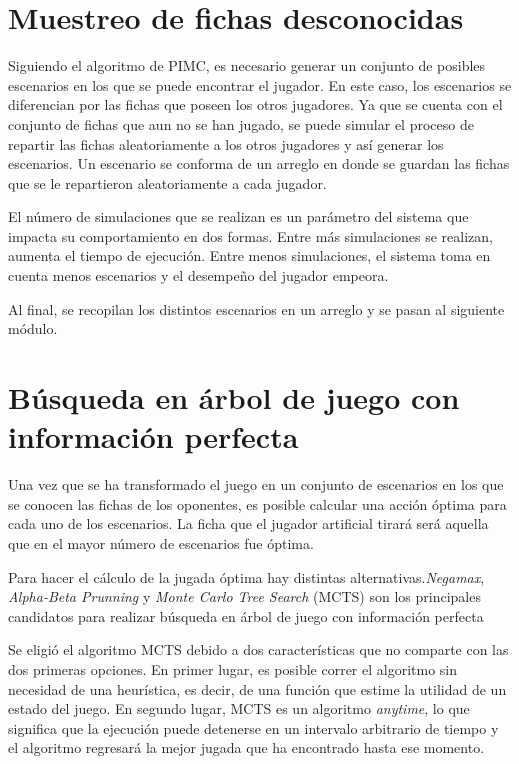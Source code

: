 \section{Muestreo de fichas desconocidas}

Siguiendo el algoritmo de PIMC, es necesario generar un conjunto de posibles escenarios 
en los que se puede encontrar el jugador. En este caso, los escenarios se diferencian por las 
fichas que poseen los otros jugadores. Ya que se cuenta con el conjunto de fichas que aun 
no se han jugado, se puede simular el proceso de repartir las fichas aleatoriamente a los 
otros jugadores y así generar los escenarios. Un escenario se conforma de un arreglo en 
donde se guardan las fichas que se le repartieron aleatoriamente a cada jugador.  

El número de simulaciones que se realizan es un parámetro del sistema que impacta su 
comportamiento en dos formas. Entre más simulaciones se realizan, aumenta el tiempo de 
ejecución. Entre menos simulaciones, el sistema toma en cuenta menos escenarios y el 
desempeño del jugador empeora. 

Al final, se recopilan los distintos escenarios en un arreglo y se pasan al siguiente módulo.

\section{Búsqueda en árbol de juego con información perfecta}

Una vez que se ha transformado el juego en un conjunto de escenarios en los que se 
conocen las fichas de los oponentes, es posible calcular una acción óptima para cada uno de 
los escenarios. La ficha que el jugador artificial tirará será aquella que en el mayor número 
de escenarios fue óptima.

Para hacer el cálculo de la jugada óptima hay distintas alternativas.\textit{Negamax}, \textit{Alpha-Beta Prunning} 
y \textit{Monte Carlo Tree Search} (MCTS) son los principales candidatos para realizar 
búsqueda en árbol de juego con información perfecta

Se eligió el algoritmo MCTS debido a dos características que no comparte con las dos 
primeras opciones. En primer lugar, es posible correr el algoritmo sin necesidad de una 
heurística, es decir, de una función que estime la utilidad de un estado del juego. En 
segundo lugar, MCTS es un algoritmo \textit{anytime}, lo que significa que la ejecución puede 
detenerse en un intervalo arbitrario de tiempo y el algoritmo regresará la mejor jugada que 
ha encontrado hasta ese momento.

